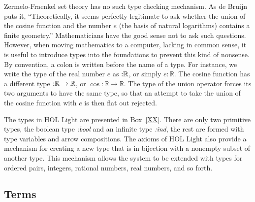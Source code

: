 \documentclass{llncs}
\def\tc{\hbox{:}}
\newcommand{\ring}[1]{\mathbb{#1}}
\begin{document}
Zermelo-Fraenkel set theory has no such type checking mechanism.  As de Bruijn
puts it,
``Theoretically, it seems perfectly legitimate
to ask whether the union of the cosine function
and the number $e$ (the basis of natural
logarithms) contains a finite geometry.''
Mathematicians have the good sense not to ask such questions.  However, when moving
mathematics to a computer, lacking in common sense, it is useful to introduce types
into the foundations
to prevent this kind of nonsense.  By convention,  a colon is written before the name of a type.  For instance, we write the type of the real number $e$ as $\tc\ring{R}$, or simply $e:\ring{R}$.
The cosine function has a different type $\tc\ring{R}\to\ring{R}$,
or $\cos:\ring{R}\to\ring{R}$.
The type of the union operator 
forces its two arguments to have the same type,
so that an attempt to take the union of the cosine function with $e$ is then flat out rejected.

The types in HOL Light are presented in Box~\ref{XX}.  There are only two primitive
types, the boolean type {\it \tc bool} and an infinite type {\it \tc ind}, the rest are formed
with type variables and arrow compositions.
The axioms of HOL Light also provide a mechanism for creating a new type
that is in bijection with a nonempty subset of another type.  This mechanism allows the system
to be extended with types for ordered pairs, integers, rational numbers, real numbers,
and so forth.

\subsection{Terms}
\end{document}
